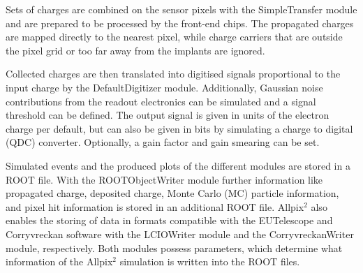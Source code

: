 Sets of charges are combined on the sensor pixels with the SimpleTransfer module and are prepared  to be processed by the front-end chips. The
propagated charges are mapped directly to the nearest pixel, while charge carriers that are outside the pixel grid or too far away from the implants are ignored.

Collected charges are then translated into digitised signals proportional to the input charge by the DefaultDigitizer module. Additionally, Gaussian noise contributions
from the readout electronics can be simulated and a signal threshold can be defined. The output signal is given in units of the electron charge per default, but
can also be given in bits by simulating a charge to digital (QDC) converter. Optionally, a gain factor and gain smearing can be set.

Simulated events and the produced plots of the different modules are stored in a ROOT file. With the ROOTObjectWriter module further information like propagated charge,
deposited charge, Monte Carlo (MC) particle information, and pixel hit information is stored in an additional ROOT file. Allpix$^2$ also enables the storing of
data in formats compatible with the EUTelescope and Corryvreckan software with the LCIOWriter module and the CorryvreckanWriter module, respectively. Both modules possess parameters, which
determine what information of the Allpix$^2$ simulation is written into the ROOT files.

